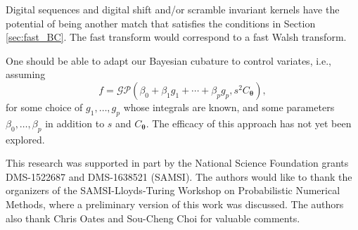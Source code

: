 \documentclass[twocolumn]{svjour3}          %
\newcommand{\bm}[1]{\boldsymbol{#1}}
\newcommand{\vtheta}{{\bm{\theta}}}
\begin{document}
Digital sequences and digital shift and/or scramble invariant kernels have the potential of being another match that satisfies the conditions in Section \ref{sec:fast_BC}.  The fast transform would correspond to a fast Walsh transform.  


One should be able to adapt our Bayesian cubature to control variates, i.e., assuming  
\begin{equation*}
f = \mathcal{GP} \left( \beta_0 + \beta_1 g_1 + \cdots + \beta_p g_p, s^2 C_\vtheta \right),
\end{equation*}
for some choice of $g_1, \ldots, g_p$ whose integrals are known, and some parameters $\beta_0, \ldots, \beta_p$ in addition to $s$ and $C_\vtheta$.  The efficacy of this approach has not yet been explored.













\begin{acknowledgements}
This research was supported in part by the National Science Foundation grants DMS-1522687 and DMS-1638521 (SAMSI).
The authors would like to thank the organizers of the SAMSI-Lloyds-Turing Workshop on Probabilistic Numerical Methods, where a preliminary version of this work was discussed.  The authors also thank Chris Oates and Sou-Cheng Choi for valuable comments.
\end{acknowledgements}



\end{document}
